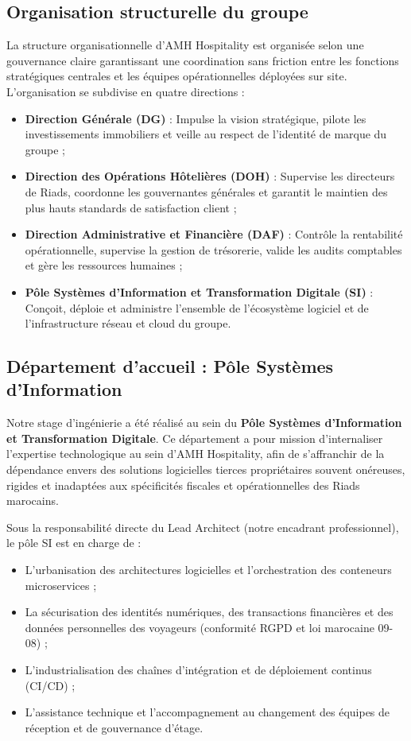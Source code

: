 \subsection{Organisation structurelle du groupe}

La structure organisationnelle d'AMH Hospitality est organisée selon une gouvernance claire garantissant une coordination sans friction entre les fonctions stratégiques centrales et les équipes opérationnelles déployées sur site. L'organisation se subdivise en quatre directions :

\begin{itemize}
    \item \textbf{Direction Générale (DG)} : Impulse la vision stratégique, pilote les investissements immobiliers et veille au respect de l'identité de marque du groupe ;
    \item \textbf{Direction des Opérations Hôtelières (DOH)} : Supervise les directeurs de Riads, coordonne les gouvernantes générales et garantit le maintien des plus hauts standards de satisfaction client ;
    \item \textbf{Direction Administrative et Financière (DAF)} : Contrôle la rentabilité opérationnelle, supervise la gestion de trésorerie, valide les audits comptables et gère les ressources humaines ;
    \item \textbf{Pôle Systèmes d'Information et Transformation Digitale (SI)} : Conçoit, déploie et administre l'ensemble de l'écosystème logiciel et de l'infrastructure réseau et cloud du groupe.
\end{itemize}

\subsection{Département d'accueil : Pôle Systèmes d'Information}

Notre stage d'ingénierie a été réalisé au sein du \textbf{Pôle Systèmes d'Information et Transformation Digitale}. Ce département a pour mission d'internaliser l'expertise technologique au sein d'AMH Hospitality, afin de s'affranchir de la dépendance envers des solutions logicielles tierces propriétaires souvent onéreuses, rigides et inadaptées aux spécificités fiscales et opérationnelles des Riads marocains.

Sous la responsabilité directe du Lead Architect (notre encadrant professionnel), le pôle SI est en charge de :
\begin{itemize}
    \item L'urbanisation des architectures logicielles et l'orchestration des conteneurs microservices ;
    \item La sécurisation des identités numériques, des transactions financières et des données personnelles des voyageurs (conformité RGPD et loi marocaine 09-08) ;
    \item L'industrialisation des chaînes d'intégration et de déploiement continus (CI/CD) ;
    \item L'assistance technique et l'accompagnement au changement des équipes de réception et de gouvernance d'étage.
\end{itemize}

